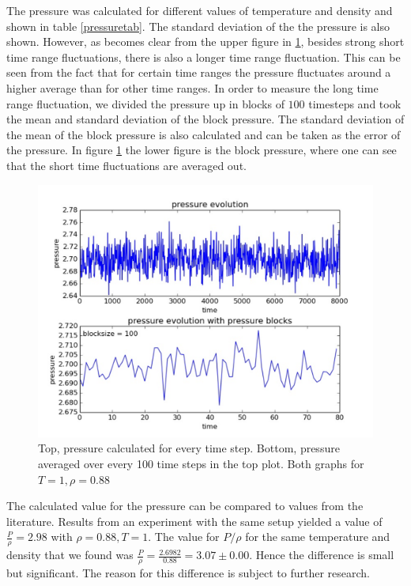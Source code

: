 \documentclass{article}
\begin{document}
\begin{multicols}{2}
The pressure was calculated for different values of temperature and density and shown in table \ref{pressuretab}. The standard deviation of the the pressure is also shown. However, as becomes clear from the upper figure in \ref{errex}, besides strong short time range fluctuations, there is also a longer time range fluctuation. This can be seen from the fact that for certain time ranges the pressure fluctuates around a higher average than for other time ranges. In order to measure the long time range fluctuation, we divided the pressure up in blocks of $100$ timesteps and took the mean and standard deviation of the block pressure. The standard deviation of the mean of the block pressure is also calculated and can be taken as the error of the pressure. In figure \ref{errex} the lower figure is the block pressure, where one can see that the short time fluctuations are averaged out.\\

\begin{figure}[H]
\begin{center}
\includegraphics[width=\linewidth]{plots/presn100lp10000T1rho088prt864.pdf}
\caption{Top, pressure calculated for every time step.  Bottom, pressure averaged over every 100 time steps in the top plot. Both graphs for $T = 1, \rho = 0.88$}
\label{errex}
\end{center}
\end{figure}

The calculated value for the pressure can be compared to values from the literature. Results from an experiment with the same setup yielded a value of $\frac{P}{\rho} = 2.98$ with $\rho = 0.88, T = 1$. The value for $P/\rho$ for the same temperature and density that we found was $\frac{P}{\rho} = \frac{2.6982}{0.88} = 3.07 \pm 0.00 $. Hence the difference is small but significant. The reason for this difference is subject to further research.


\end{multicols}
\end{document}

